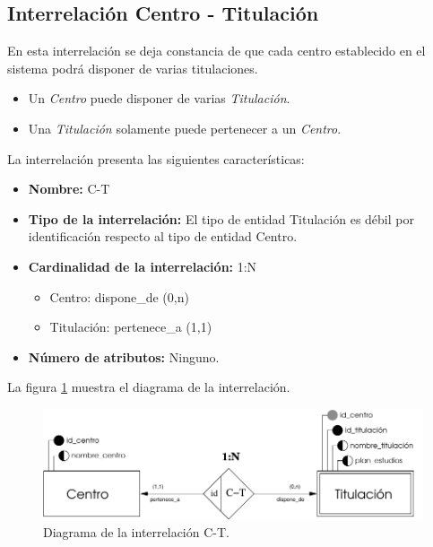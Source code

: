 \subsection{Interrelación Centro - Titulación}

   \begin{description}
      \item[Definición] En esta interrelación se deja constancia de que cada
      centro establecido en el sistema podrá disponer de varias titulaciones.

      \begin{itemize}
       \item Un \textit{Centro} puede disponer de varias \textit{Titulación}.
       \item Una \textit{Titulación} solamente puede pertenecer a un
             \textit{Centro}.
      \end{itemize}

      \item[Características] La interrelación presenta las siguientes
                             características:

         \begin{itemize}
            \item \textbf{Nombre:} C-T
            \item \textbf{Tipo de la interrelación:} El tipo de entidad
                  Titulación es débil por identificación respecto al tipo de
                  entidad Centro.
            \item \textbf{Cardinalidad de la interrelación:} 1:N
                  \begin{itemize}
                     \item Centro: dispone\_de (0,n)
                     \item Titulación: pertenece\_a (1,1)
                  \end{itemize}
            \item \textbf{Número de atributos:} Ninguno.
         \end{itemize}

      \item[Diagrama] La figura \ref{diagramaC-T} muestra el diagrama de la
                      interrelación.
      \item \begin{figure}[!ht]
            \begin{center}
            \includegraphics[]{07.Modelo_Entidad-Interrelacion/7.3.Analisis_Interrelaciones/diagramas/C-T.pdf}
            \caption{Diagrama de la interrelación C-T.}
            \label{diagramaC-T}
            \end{center}
         \end{figure}


\end{description}
